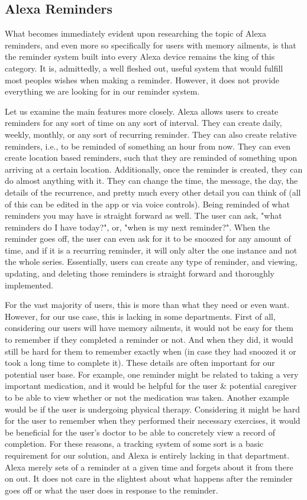 \documentclass[11pt, oneside]{article}
\begin{document}
\subsection{Alexa Reminders}

What becomes immediately evident upon researching the topic of Alexa reminders, and even more so specifically for users with memory ailments, is that the reminder system built into every Alexa device remains the king of this category. 
It is, admittedly, a well fleshed out, useful system that would fulfill most peoples wishes when making a reminder. 
However, it does not provide everything we are looking for in our reminder system. 

Let us examine the main features more closely. 
Alexa allows users to create reminders for any sort of time on any sort of interval. 
They can create daily, weekly, monthly, or any sort of recurring reminder. 
They can also create relative reminders, i.e., to be reminded of something an hour from now. 
They can even create location based reminders, such that they are reminded of something upon arriving at a certain location. 
Additionally, once the reminder is created, they can do almost anything with it. 
They can change the time, the message, the day, the details of the recurrence, and pretty much every other detail you can think of (all of this can be edited in the app or via voice controls).
Being reminded of what reminders you may have is straight forward as well. The user can ask, "what reminders do I have today?", or, "when is my next reminder?". 
When the reminder goes off, the user can even ask for it to be snoozed for any amount of time, and if it is a recurring reminder, it will only alter the one instance and not the whole series. 
Essentially, users can create any type of reminder, and viewing, updating, and deleting those reminders is straight forward and thoroughly implemented.  

For the vast majority of users, this is more than what they need or even want. 
However, for our use case, this is lacking in some departments. 
First of all, considering our users will have memory ailments, it would not be easy for them to remember if they completed a reminder or not. 
And when they did, it would still be hard for them to remember exactly when (in case they had snoozed it or took a long time to complete it).
These details are often important for our potential user base. 
For example, one reminder might be related to taking a very important medication, and it would be helpful for the user \& potential caregiver to be able to view whether or not the medication was taken. 
Another example would be if the user is undergoing physical therapy. Considering it might be hard for the user to remember when they performed their necessary exercises, it would be beneficial for the user's doctor to be able to concretely view a record of completion. 
For these reasons, a tracking system of some sort is a basic requirement for our solution, and Alexa is entirely lacking in that department. 
Alexa merely sets of a reminder at a given time and forgets about it from there on out. 
It does not care in the slightest about what happens after the reminder goes off or what the user does in response to the reminder. 
\end{document}
